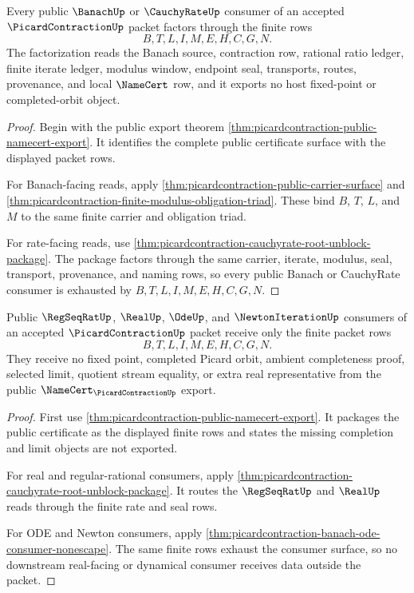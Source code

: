 \begin{theorem}
\label{thm:picardcontraction-public-banach-cauchyrate-factorization}
Every public $\BanachUp$ or $\CauchyRateUp$ consumer of an accepted
$\PicardContractionUp$ packet factors through the finite rows
$$
B,T,L,I,M,E,H,C,G,N.
$$
The factorization reads the Banach source, contraction row, rational ratio
ledger, finite iterate ledger, modulus window, endpoint seal, transports,
routes, provenance, and local $\NameCert$ row, and it exports no host
fixed-point or completed-orbit object.
\end{theorem}
\begin{proof}
Begin with the public export theorem
\autoref{thm:picardcontraction-public-namecert-export}. It identifies the
complete public certificate surface with the displayed packet rows.

For Banach-facing reads, apply
\autoref{thm:picardcontraction-public-carrier-surface} and
\autoref{thm:picardcontraction-finite-modulus-obligation-triad}. These bind
$B$, $T$, $L$, and $M$ to the same finite carrier and obligation triad.

For rate-facing reads, use
\autoref{thm:picardcontraction-cauchyrate-root-unblock-package}. The package
factors through the same carrier, iterate, modulus, seal, transport,
provenance, and naming rows, so every public Banach or CauchyRate consumer is
exhausted by $B,T,L,I,M,E,H,C,G,N$.
\end{proof}

\begin{theorem}
\label{thm:picardcontraction-public-real-consumer-boundary}
Public $\RegSeqRatUp$, $\RealUp$, $\OdeUp$, and $\NewtonIterationUp$ consumers
of an accepted $\PicardContractionUp$ packet receive only the finite packet
rows
$$
B,T,L,I,M,E,H,C,G,N.
$$
They receive no fixed point, completed Picard orbit, ambient completeness
proof, selected limit, quotient stream equality, or extra real representative
from the public $\NameCert_{\PicardContractionUp}$ export.
\end{theorem}
\begin{proof}
First use \autoref{thm:picardcontraction-public-namecert-export}. It packages
the public certificate as the displayed finite rows and states the missing
completion and limit objects are not exported.

For real and regular-rational consumers, apply
\autoref{thm:picardcontraction-cauchyrate-root-unblock-package}. It routes
the $\RegSeqRatUp$ and $\RealUp$ reads through the finite rate and seal rows.

For ODE and Newton consumers, apply
\autoref{thm:picardcontraction-banach-ode-consumer-nonescape}. The same
finite rows exhaust the consumer surface, so no downstream real-facing or
dynamical consumer receives data outside the packet.
\end{proof}

